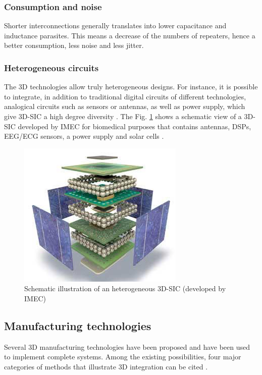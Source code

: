 \subsubsection{Consumption and noise}

Shorter interconnections generally translates into lower capacitance and inductance parasites. This means a decrease of the numbers of repeaters, hence a better consumption, less noise and less jitter.

\subsubsection{Heterogeneous circuits}

The 3D technologies allow truly heterogeneous designs. For instance, it is possible to integrate, in addition to traditional digital circuits of different technologies, analogical circuits such as sensors or antennas, as well as power supply, which give 3D-SIC a high degree diversity \cite{4299568}. The Fig. \ref{fig:heterogeneity} shows a schematic view of a 3D-SIC developed by IMEC for biomedical purposes that contains antennas, DSPs, EEG/ECG sensors, a power supply and solar cells \cite{4198870}.

\begin{figure}[h!]
\begin{center}
\includegraphics[width=0.5\linewidth]{heterogeneity.png}
\end{center}
\vspace{-0.5cm}
\caption{Schematic illustration of an heterogeneous 3D-SIC (developed by IMEC) \cite{4198870}}
\label{fig:heterogeneity}
\end{figure}

\subsection{Manufacturing technologies}

Several 3D manufacturing technologies have been proposed and have been used to implement complete systems. Among the existing possibilities, four major categories of methods that illustrate 3D integration can be cited \cite{659500,1652906}.

